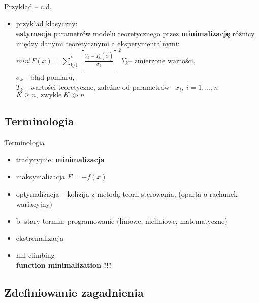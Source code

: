   \begin{frame}
    \begin{exampleblock}{Przykład -- c.d.}
      \begin{itemize}
        \item przykład klasyczny:\\
        \textbf{estymacja} parametrów modelu teoretycznego
        przez \textbf{minimalizację} różnicy między danymi
        teoretycznymi a eksperymentalnymi:\\
        $
          min!F(x) = \sum_{k/1}^{k} \left[ \frac{Y_k - T_k(\vec x)}{\sigma_k}
          \right] ^2 Y_k \text{-- zmierzone wartości,}
        $ \\
        $ \sigma_k $ - błąd pomiaru,\\
        $ T_k $ - wartości teoretyczne, zależne od parametrów~
        $ x_i{,}\ i=1{,} \dots {,}n $ \\
        $ K \geq n{,}\ \text{zwykle}\ K \gg n $
      \end{itemize}
    \end{exampleblock}
  \end{frame}

\subsection{Terminologia}

  \begin{frame}
    \begin{block}{Terminologia}
      \begin{itemize}
        \item tradycyjnie: \textbf{minimalizacja}
        \item maksymalizacja $ F = -f(x)$
        \item optymalizacja -- kolizija z metodą teorii
        sterowania, (oparta o rachunek wariacyjny)
        \item b. stary termin: programowanie (liniowe,
        nieliniowe, matematyczne)
        \item ekstremalizacja
        \item hill-climbing \\
        \textbf{function minimalization !!!}
      \end{itemize}
    \end{block}
  \end{frame}

\subsection{Zdefiniowanie zagadnienia}

